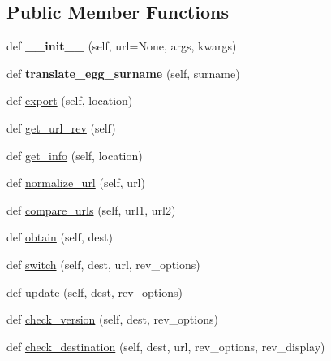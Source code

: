 \subsection*{Public Member Functions}
\begin{DoxyCompactItemize}
\item 
\mbox{\label{classpip_1_1vcs_1_1_version_control_a861e9d1bf1537ef6e41ec540dc17c143}} 
def {\bfseries \+\_\+\+\_\+init\+\_\+\+\_\+} (self, url=None, args, kwargs)
\item 
\mbox{\label{classpip_1_1vcs_1_1_version_control_af73480f0d550add342360ffc32aea21e}} 
def {\bfseries translate\+\_\+egg\+\_\+surname} (self, surname)
\item 
def \hyperlink{classpip_1_1vcs_1_1_version_control_a342a59cf20ab9a1b3016c9ba58bfa90e}{export} (self, location)
\item 
def \hyperlink{classpip_1_1vcs_1_1_version_control_a365d5d1efc7c26df38667b921d33c650}{get\+\_\+url\+\_\+rev} (self)
\item 
def \hyperlink{classpip_1_1vcs_1_1_version_control_a3152fffa744da2879caa9c61cee6adad}{get\+\_\+info} (self, location)
\item 
def \hyperlink{classpip_1_1vcs_1_1_version_control_a889ca4bd7dfd9700c989e843984be462}{normalize\+\_\+url} (self, url)
\item 
def \hyperlink{classpip_1_1vcs_1_1_version_control_a1ffc1f50c911a7e8a7291a5987122ccc}{compare\+\_\+urls} (self, url1, url2)
\item 
def \hyperlink{classpip_1_1vcs_1_1_version_control_a70dae191844588c58622e5d1b1302da0}{obtain} (self, dest)
\item 
def \hyperlink{classpip_1_1vcs_1_1_version_control_a5a49d9df40b940ea3abdd08ca00ed819}{switch} (self, dest, url, rev\+\_\+options)
\item 
def \hyperlink{classpip_1_1vcs_1_1_version_control_a21a7db52b55e48e35d17c1981fcd707f}{update} (self, dest, rev\+\_\+options)
\item 
def \hyperlink{classpip_1_1vcs_1_1_version_control_abc7a71e49906cb31fedaddbe55bf049d}{check\+\_\+version} (self, dest, rev\+\_\+options)
\item 
def \hyperlink{classpip_1_1vcs_1_1_version_control_aa75c5ce1487ef8f34e91b6a0d46bc561}{check\+\_\+destination} (self, dest, url, rev\+\_\+options, rev\+\_\+display)
\item 

\end{DoxyCompactItemize}
